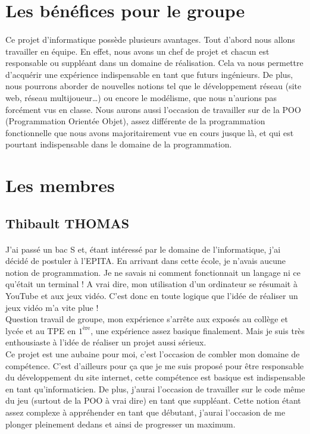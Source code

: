 \documentclass[12pt]{report}
\begin{document}
	\section{Les bénéfices pour le groupe}
	\paragraph{}
		Ce projet d'informatique possède plusieurs avantages. Tout d'abord nous allons travailler en équipe. En effet, nous avons un chef de projet et chacun est responsable ou suppléant dans un domaine de réalisation. Cela va nous permettre d'acquérir une expérience indispensable en tant que futurs ingénieurs. De plus, nous pourrons aborder de nouvelles notions tel que le développement réseau (site web, réseau multijoueur…) ou encore le modélisme, que nous n'aurions pas forcément vus en classe. Nous aurons aussi l'occasion de travailler sur de la POO (Programmation Orientée Objet), assez différente de la programmation fonctionnelle que nous avons majoritairement vue en cours jusque là, et qui est pourtant indispensable dans le domaine de la programmation.

	\section{Les membres}
		\subsection{Thibault THOMAS}
		\paragraph{}
		
J'ai passé un bac S et, étant intéressé par le domaine de l'informatique, j'ai décidé de postuler à l'EPITA. En arrivant dans cette école, je n'avais aucune notion de programmation. Je ne savais ni comment fonctionnait un langage ni ce qu'était un terminal !
A vrai dire, mon utilisation d'un ordinateur se résumait à YouTube et aux jeux vidéo. C'est donc en toute logique que l'idée de réaliser un jeux vidéo m'a vite plue ! \\
Question travail de groupe, mon expérience s'arrête aux exposés au collège et lycée et au TPE en $\textrm{1}^\textrm{ère}$, une expérience assez basique finalement. Mais je suis très enthousiaste à l'idée de réaliser un projet aussi sérieux. \\
		
			 Ce projet est une aubaine pour moi, c'est l'occasion de combler mon domaine de compétence. C'est d'ailleurs pour ça que je me suis proposé pour être responsable du développement du site internet, cette compétence est basique est indispensable en tant qu'informaticien. De plus, j'aurai l'occasion de travailler sur le code même du jeu (surtout de la POO à vrai dire) en tant que suppléant. Cette notion étant assez complexe à appréhender en tant que débutant, j'aurai l'occasion de me plonger pleinement dedans et ainsi de progresser un maximum. 
		
\end{document}
